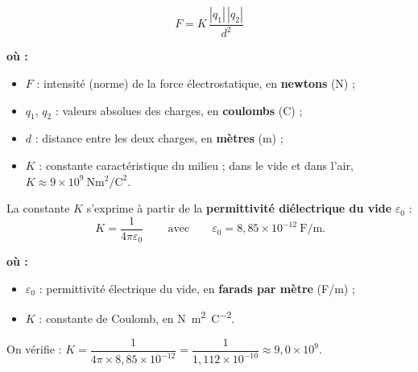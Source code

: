 \documentclass[11pt,a4paper]{article}
\newenvironment{ou}{%
  \par\smallskip\noindent\textbf{où :}\nopagebreak
  \begin{itemize}[leftmargin=1.8em,topsep=2pt,itemsep=1.5pt,parsep=0pt]}%
  {\end{itemize}}
\begin{document}
\begin{formule}
\[ F = K\,\dfrac{|q_1|\,|q_2|}{d^{2}} \]
\begin{ou}
  \item $F$ : intensité (norme) de la force électrostatique, en \textbf{newtons} (\si{\newton}) ;
  \item $q_1,\,q_2$ : valeurs absolues des charges, en \textbf{coulombs} (\si{\coulomb}) ;
  \item $d$ : distance entre les deux charges, en \textbf{mètres} (\si{\metre}) ;
  \item $K$ : constante caractéristique du milieu ; dans le vide et dans l'air,
        $K \approx 9\times 10^{9}\ \si{\newton\metre\squared\per\coulomb\squared}$.
\end{ou}
\end{formule}

\begin{formule}
La constante $K$ s'exprime à partir de la \textbf{permittivité diélectrique du vide} $\varepsilon_0$ :
\[ \boxed{\,K = \dfrac{1}{4\pi\varepsilon_0}\,}\qquad\text{avec}\qquad
   \varepsilon_0 = 8{,}85\times 10^{-12}\ \mathrm{F/m}. \]
\begin{ou}
  \item $\varepsilon_0$ : permittivité électrique du vide, en \textbf{farads par mètre} (F/m) ;
  \item $K$ : constante de Coulomb, en \si{\newton\metre\squared\per\coulomb\squared}.
\end{ou}
On vérifie : $K = \dfrac{1}{4\pi\times 8{,}85\times 10^{-12}} = \dfrac{1}{1{,}112\times 10^{-10}}
\approx 9{,}0\times 10^{9}$.
\end{formule}
\end{document}
